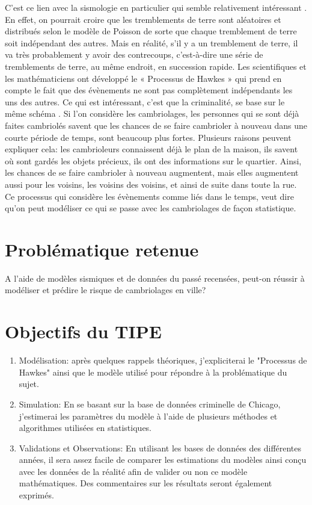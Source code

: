 \documentclass[12pt,a4paper]{article}
\begin{document}
C’est ce lien avec la sismologie en particulier qui semble relativement intéressant \cite{Youtube}. En effet, on pourrait croire que les tremblements de terre sont aléatoires et distribués selon le modèle de Poisson de sorte que chaque tremblement de terre soit indépendant des autres. Mais en réalité, s’il y a un tremblement de terre, il va très probablement y avoir des contrecoups, c’est-à-dire une série de tremblements de terre, au même endroit, en succession rapide. Les scientifiques et les mathématiciens ont développé le « Processus de Hawkes » \cite{Hawkes} qui prend en compte le fait que des évènements ne sont pas complètement indépendants les uns des autres. Ce qui est intéressant, c’est que la criminalité, se base sur le même schéma \cite{Risque}. Si l'on considère les cambriolages, les personnes qui se sont déjà faites cambriolés savent que les chances de se faire cambrioler à nouveau dans une courte période de temps, sont beaucoup plus fortes. Plusieurs raisons peuvent expliquer cela: les cambrioleurs connaissent déjà le plan de la maison, ils savent où sont gardés les objets précieux, ils ont des informations sur le quartier. Ainsi, les chances de se faire cambrioler à nouveau augmentent, mais elles augmentent aussi pour les voisins, les voisins des voisins, et ainsi de suite dans toute la rue. Ce processus qui considère les évènements comme liés dans le temps, veut dire qu’on peut modéliser ce qui se passe avec les cambriolages de façon statistique. 


\section*{Problématique retenue}

A l’aide de modèles sismiques et de données du passé recensées, peut-on réussir à modéliser et prédire le risque de cambriolages en ville?

\section*{Objectifs du TIPE}

\begin{enumerate}
    
	\item	Modélisation: après quelques rappels théoriques, j'expliciterai le "Processus de Hawkes" ainsi que le modèle utilisé pour répondre à la problématique du sujet.
    
    \item	Simulation: En se basant sur la base de données criminelle de Chicago, j'estimerai les paramètres du modèle à l'aide de plusieurs méthodes et algorithmes utilisées en statistiques.
    
    \item	Validations et Observations: En utilisant les bases de données des différentes années, il sera assez facile de comparer les estimations du modèles ainsi conçu avec les données de la réalité afin de valider ou non ce modèle mathématiques. Des commentaires sur les résultats seront également exprimés.
    
\end{enumerate}

\end{document}
